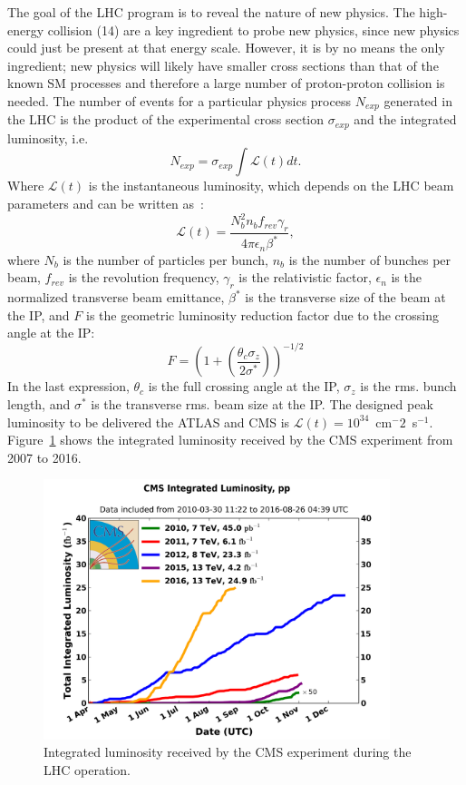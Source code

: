 The goal of the LHC program is to reveal the nature of new
physics. The high-energy collision (14\TeV) are a key ingredient to probe new
physics, since new physics could just be present at that energy
scale. However, it is by no means the only ingredient; new physics
will likely have smaller cross sections than that of the known SM
processes and therefore a large number of proton-proton collision is
needed. The number of events for a particular physics process $N_{exp}$
generated in the LHC is the product of the experimental cross section $\sigma_{exp}$
and the integrated luminosity, i.e.
\begin{equation}
N_{exp} = \sigma_{exp}\int\mathcal{L}(t)dt.
\end{equation}
Where $\mathcal{L}(t)$ is the instantaneous luminosity, which depends
on the LHC beam parameters and can be written as~\cite{LHCbeamParam}:
\begin{equation}
\mathcal{L}(t) = \frac{N^{2}_{b}n_{b}f_{rev}\gamma_{r}}{4\pi\epsilon_{n}\beta^{*}},
\end{equation}
where $N_{b}$ is the number of particles per bunch, $n_{b}$ is the
number of bunches per beam, $f_{rev}$ is the revolution frequency,
$\gamma_{r}$ is the relativistic factor, $\epsilon_{n}$ is the
normalized transverse beam emittance, $\beta^{*}$ is the transverse
size of the beam at the IP, and $F$ is the geometric luminosity
reduction factor due to the crossing angle at the IP:
\begin{equation}
F=\left(1+\left(\frac{\theta_{c}\sigma_{z}}{2\sigma^{*}}\right)\right)^{-1/2}
\end{equation}
In the last expression, $\theta_{c}$ is the full crossing angle at the
IP, $\sigma_{z}$ is the rms. bunch length, and $\sigma^{*}$ is the
transverse rms. beam size at the IP. The designed peak luminosity to be
delivered the ATLAS and CMS is $\mathcal{L}(t) = 10^{34}$~cm$^-2$~s$^{-1}$.  
Figure~\ref{fig:lumi} shows the integrated luminosity
received by the CMS experiment from 2007 to 2016. 
\begin{figure}
 \centering
 \includegraphics[width=0.9\textwidth]{LHC_fig/int_lumi_cumulative_pp_2.png}
 \caption{Integrated luminosity received by the CMS experiment during the LHC operation.\label{fig:lumi} }
\end{figure}
